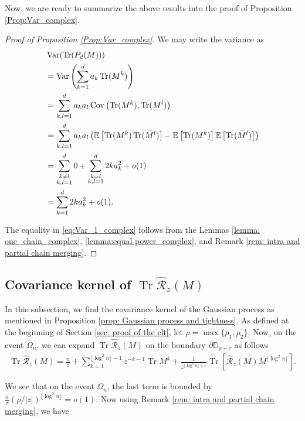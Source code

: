 \documentclass[12pt]{amsart}
\theoremstyle{plain}
\theoremstyle{definition}
\newcommand{\Tr}{\operatorname{Tr}}
\newcommand{\Var}{\operatorname{Var}}
\newcommand{\Cov}{\operatorname{Cov}}
\begin{document}
Now, we are ready to summarize the above results into the proof of Proposition \ref{Prop:Var_complex}.
\begin{proof}[Proof of Proposition \ref{Prop:Var_complex}]
We may write the variance as 
\begin{align} \label{eq:Var_1_complex}
&\Var(\Tr(P_{d}(M))) \notag \\
&= \Var\left(\sum_{k=1}^{d}a_{k} \Tr(M^{k})\right) \notag \\
&= \sum_{k,l=1}^{d}  a_{k} a_{l} \Cov\left(\Tr(M^k),\Tr(M^l)\right) \notag \\
&= \sum_{k,l=1}^{d} a_{k} a_{l}\left(\mathbb{E}\left[\Tr(M^k)\Tr (\bar{M}^l)\right]-\mathbb{E}\left[\Tr(M^k)\right] \mathbb{E}\left[\Tr(\bar{M}^l)\right]\right) \notag\\
&=\sum_{\substack{k\neq l \\ k,l=1}}^d 0 
+ \sum_{\substack{k = l \\ k,l=1}}^d2ka_{k}^2+o(1)\\
&= \sum_{k=1}^d2k a_{k}^2+o(1).\notag
\end{align}

The equality in \eqref{eq:Var_1_complex} follows from the Lemmas \ref{lemma: one_chain_complex}, \ref{lemma:equal power_complex}, and Remark \ref{rem: intra and partial chain merging}.
\end{proof}


\subsection{Covariance kernel of $\Tr \hat{\mathcal{R}}_{z}(M)$}\label{sec: calculation of the covariance kernel} In this subsection, we find the covariance kernel of the Gaussian process as mentioned in Proposition \ref{prop: Gaussian process and tightness}. As defined at the beginning of Section \ref{sec: proof of the clt}, let $\rho=\max\{\rho_{1}, \rho_{2}\}$. Now, on the event $\Omega_{n}$, we can expand $\Tr \hat{\mathcal{R}}_{z}(M)$ on the boundary $\partial \mathbb{D}_{\rho+\tau}$ as follows
\begin{align*}
    \Tr \hat{\mathcal{R}}_{z}(M)=\frac{n}{z}+\sum_{k=1}^{\lfloor \log^{2} n\rfloor - 1}z^{-k-1}\Tr M^{k} + \frac{1}{z^{\lfloor \log^{2} n\rfloor +1}}\Tr[\hat{\mathcal{R}}_{z}(M)M^{\lfloor \log^{2} n \rfloor}].
\end{align*}

We see that on the event $\Omega_{n}$, the last term is bounded by $\frac{n}{\tau}(\rho/|z|)^{\lfloor \log^{2} n \rfloor} = o(1).$ Now using Remark \ref{rem: intra and partial chain merging}, we have
\end{document}

